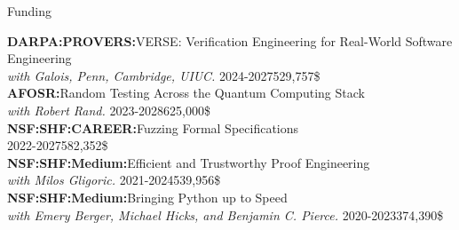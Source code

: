 \documentclass{resume} %
\begin{document}
\begin{rSection}{Funding}

  {\bf DARPA:PROVERS:}{VERSE: Verification Engineering for Real-World Software Engineering}\\
  {\em with Galois, Penn, Cambridge, UIUC.} 2024-2027\hfill{529,757\$}\\
  
  {\bf AFOSR:}{Random Testing Across the Quantum Computing Stack}\\
  {\em with Robert Rand.} 2023-2028\hfill{625,000\$}\\
  
  {\bf NSF:SHF:CAREER:}{Fuzzing Formal Specifications}\\
  2022-2027\hfill{582,352\$}\\
  
  {\bf NSF:SHF:Medium:}{Efficient and Trustworthy Proof Engineering}\\
  {\em with Milos Gligoric.} 2021-2024\hfill{539,956\$}\\
  
  {\bf NSF:SHF:Medium:}Bringing Python up to Speed\\
  {\em with Emery Berger, Michael Hicks, and Benjamin C. Pierce.} 2020-2023\hfill{374,390\$}\\
  
\end{rSection}


\newcommand{\Catalin}{C\u{a}t\u{a}lin\xspace}
\newcommand{\Hritcu}{Hri\c{t}cu\xspace}
\newcommand{\Denes}{D\'en\`es\xspace}

\newcommand{\pub}[4]{
  {\bf #1} \hfill {\href{https://lemonidas.github.io/pdf/#2}{\bf \em #4}}\\
  {#3}
  }

\newcommand{\pubtwo}[6]{
  {\bf #1} \hfill {\href{https://lemonidas.github.io/pdf/#2}{\bf \em #4}}, {\href{https://lemonidas.github.io/pdf/#5}{\bf \em #6}}\\
  {#3}
  }

\newcommand{\pubsub}[5]{
  {\bf #1:} \hfill {\href{https://lemonidas.github.io/pdf/#2}{\bf \em #4}}\\
  {\bf #5}\\
  {#3}
  }
\end{document}
